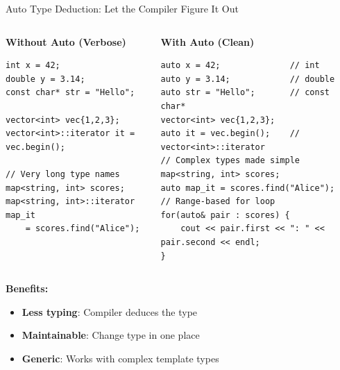 \begin{frame}[fragile]{ Auto Type Deduction: Let the Compiler Figure It Out}
	\begin{columns}
		\begin{column}{0.5\textwidth}
			\textbf{Without Auto (Verbose)}
			\begin{verbatim}
int x = 42;
double y = 3.14;
const char* str = "Hello";

vector<int> vec{1,2,3};
vector<int>::iterator it = vec.begin();

// Very long type names
map<string, int> scores;
map<string, int>::iterator map_it
    = scores.find("Alice");
			\end{verbatim}
		\end{column}
		\begin{column}{0.5\textwidth}
			\textbf{With Auto (Clean)}
			\begin{verbatim}
auto x = 42;              // int
auto y = 3.14;            // double
auto str = "Hello";       // const char*
vector<int> vec{1,2,3};
auto it = vec.begin();    // vector<int>::iterator
// Complex types made simple
map<string, int> scores;
auto map_it = scores.find("Alice");
// Range-based for loop
for(auto& pair : scores) {
    cout << pair.first << ": " << pair.second << endl;
}
			\end{verbatim}
		\end{column}
	\end{columns}

	\vspace{0.5em}
	\textbf{Benefits:}
	\begin{itemize}
		\item \textbf{Less typing}: Compiler deduces the type
		\item \textbf{Maintainable}: Change type in one place
		\item \textbf{Generic}: Works with complex template types
	\end{itemize}
\end{frame}
